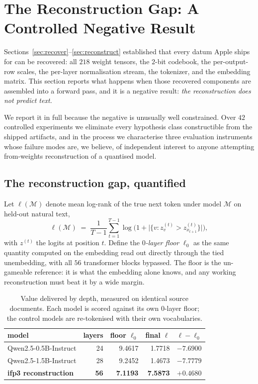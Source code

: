 \section{The Reconstruction Gap: A Controlled Negative Result}\label{sec:gap}

Sections~\ref{sec:recover}--\ref{sec:reconstruct} established that every datum Apple ships for
 can be recovered: all $218$ weight tensors, the $2$-bit codebook, the
per-output-row scales, the per-layer normalisation stream, the tokenizer, and the embedding
matrix. This section reports what happens when those recovered components are assembled into a
forward pass, and it is a negative result: \emph{the reconstruction does not predict text.}

We report it in full because the negative is unusually well constrained. Over $42$ controlled
experiments we eliminate every hypothesis class constructible from the shipped artifacts, and in
the process we characterise three evaluation instruments whose failure modes are, we believe, of
independent interest to anyone attempting from-weights reconstruction of a quantised model.

\subsection{The reconstruction gap, quantified}

Let $\ell(\mathcal{M})$ denote mean log-rank of the true next token under model $\mathcal{M}$ on
held-out natural text,
\[
  \ell(\mathcal{M}) \;=\; \frac{1}{T-1}\sum_{t=1}^{T-1}
  \log\bigl(1 + \bigl|\{v : z_v^{(t)} > z_{x_{t+1}}^{(t)}\}\bigr|\bigr),
\]
with $z^{(t)}$ the logits at position $t$. Define the \emph{$0$-layer floor} $\ell_0$ as the same
quantity computed on the embedding read out directly through the tied unembedding, with all $56$
transformer blocks bypassed. The floor is the un-gameable reference: it is what the embedding
alone knows, and any working reconstruction must beat it by a wide margin.

\begin{table}[h]
\centering\small
\caption{Value delivered by depth, measured on identical source documents. Each model is scored
against its own $0$-layer floor; the control models are re-tokenised with their own vocabularies.}
\begin{tabular}{lrrrr}
\toprule
model & layers & floor $\ell_0$ & final $\ell$ & $\ell-\ell_0$ \\
\midrule
Qwen2.5-0.5B-Instruct & 24 & 9.4617 & 1.7718 & $-7.6900$ \\
Qwen2.5-1.5B-Instruct & 28 & 9.2452 & 1.4673 & $-7.7779$ \\
\textbf{ifp3 reconstruction} & \textbf{56} & \textbf{7.1193} & \textbf{7.5873} & $\mathbf{+0.4680}$ \\
\bottomrule
\end{tabular}
\end{table}

